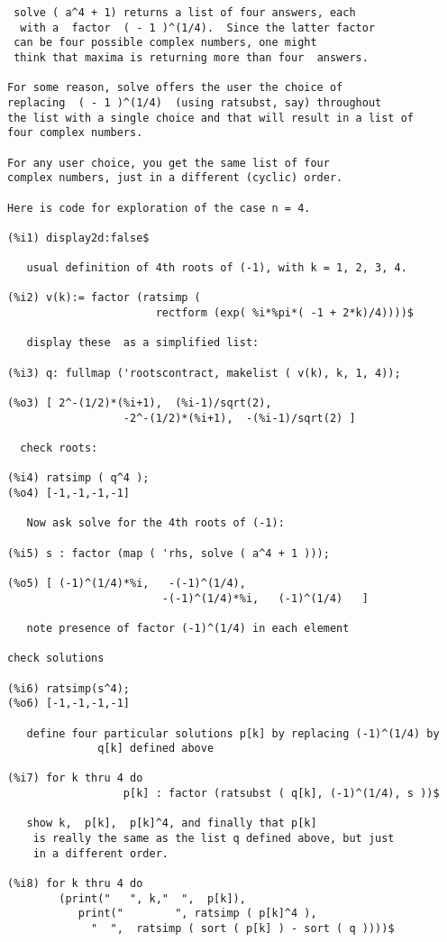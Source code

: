 \documentclass[12pt]{article}
\begin{document}
\begin{verbatim}
 solve ( a^4 + 1) returns a list of four answers, each
  with a  factor  ( - 1 )^(1/4).  Since the latter factor
 can be four possible complex numbers, one might
 think that maxima is returning more than four  answers.

For some reason, solve offers the user the choice of
replacing  ( - 1 )^(1/4)  (using ratsubst, say) throughout 
the list with a single choice and that will result in a list of
four complex numbers.

For any user choice, you get the same list of four
complex numbers, just in a different (cyclic) order.

Here is code for exploration of the case n = 4.

(%i1) display2d:false$

   usual definition of 4th roots of (-1), with k = 1, 2, 3, 4.

(%i2) v(k):= factor (ratsimp ( 
                       rectform (exp( %i*%pi*( -1 + 2*k)/4))))$

   display these  as a simplified list:

(%i3) q: fullmap ('rootscontract, makelist ( v(k), k, 1, 4));

(%o3) [ 2^-(1/2)*(%i+1),  (%i-1)/sqrt(2),
                  -2^-(1/2)*(%i+1),  -(%i-1)/sqrt(2) ]
 
  check roots:

(%i4) ratsimp ( q^4 );
(%o4) [-1,-1,-1,-1]

   Now ask solve for the 4th roots of (-1):

(%i5) s : factor (map ( 'rhs, solve ( a^4 + 1 )));

(%o5) [ (-1)^(1/4)*%i,   -(-1)^(1/4),   
                        -(-1)^(1/4)*%i,   (-1)^(1/4)   ]

   note presence of factor (-1)^(1/4) in each element

check solutions

(%i6) ratsimp(s^4);
(%o6) [-1,-1,-1,-1]

   define four particular solutions p[k] by replacing (-1)^(1/4) by
              q[k] defined above
 
(%i7) for k thru 4 do 
                  p[k] : factor (ratsubst ( q[k], (-1)^(1/4), s ))$

   show k,  p[k],  p[k]^4, and finally that p[k]
    is really the same as the list q defined above, but just
    in a different order.
  
(%i8) for k thru 4 do
        (print("   ", k,"  ",  p[k]),
           print("        ", ratsimp ( p[k]^4 ),
             "  ",  ratsimp ( sort ( p[k] ) - sort ( q ))))$


\end{verbatim}
\end{document}
